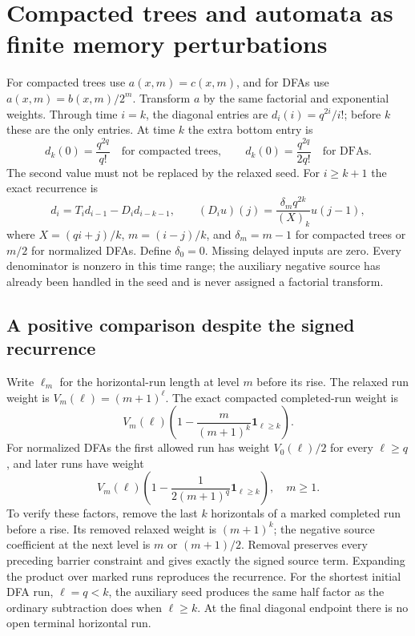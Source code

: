 \documentclass[11pt,letterpaper]{article}
\numberwithin{equation}{section}
\theoremstyle{remark}
\newcommand{\one}{\mathbf1}
\begin{document}
\section{Compacted trees and automata as finite memory perturbations}
For compacted trees use $a(x,m)=c(x,m)$, and for DFAs use $a(x,m)=b(x,m)/2^m$. Transform $a$ by the same factorial and exponential weights. Through time $i=k$, the diagonal entries are $d_i(i)=q^{2i}/i!$; before $k$ these are the only entries. At time $k$ the extra bottom entry is
\[
 d_k(0)=\frac{q^{2q}}{q!}\quad\text{for compacted trees},\qquad
 d_k(0)=\frac{q^{2q}}{2q!}\quad\text{for DFAs}.
\]
The second value must not be replaced by the relaxed seed. For $i\ge k+1$ the exact recurrence is
\begin{equation}\label{air:ka:eq:delay}
 d_i=T_id_{i-1}-D_id_{i-k-1},\qquad
 (D_iu)(j)=\frac{\delta_mq^{2k}}{(X)_k}u(j-1),
\end{equation}
where $X=(qi+j)/k$, $m=(i-j)/k$, and $\delta_m=m-1$ for compacted trees or $m/2$ for normalized DFAs. Define $\delta_0=0$. Missing delayed inputs are zero. Every denominator is nonzero in this time range; the auxiliary negative source has already been handled in the seed and is never assigned a factorial transform.

\subsection{A positive comparison despite the signed recurrence}\label{air:ka:subsec:comparison}
Write $\ell_m$ for the horizontal-run length at level $m$ before its rise. The relaxed run weight is $V_m(\ell)=(m+1)^\ell$. The exact compacted completed-run weight is
\[
 V_m(\ell)\left(1-\frac{m}{(m+1)^k}\one_{\ell\ge k}\right).
\]
For normalized DFAs the first allowed run has weight $V_0(\ell)/2$ for every $\ell\ge q$, and later runs have weight
\[
 V_m(\ell)\left(1-\frac{1}{2(m+1)^q}\one_{\ell\ge k}\right),\quad m\ge1.
\]
To verify these factors, remove the last $k$ horizontals of a marked completed run before a rise. Its removed relaxed weight is $(m+1)^k$; the negative source coefficient at the next level is $m$ or $(m+1)/2$. Removal preserves every preceding barrier constraint and gives exactly the signed source term. Expanding the product over marked runs reproduces the recurrence. For the shortest initial DFA run, $\ell=q<k$, the auxiliary seed produces the same half factor as the ordinary subtraction does when $\ell\ge k$. At the final diagonal endpoint there is no open terminal horizontal run.
\end{document}
